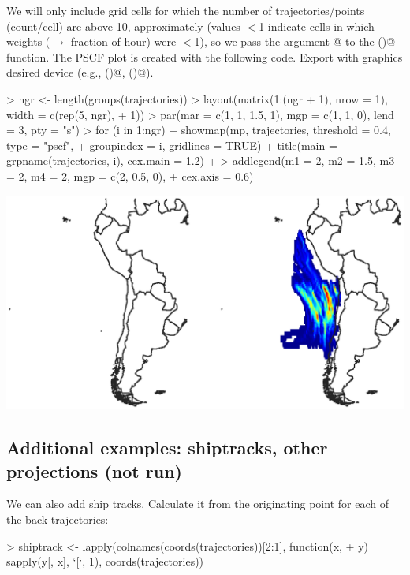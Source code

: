 \documentclass{article}
\renewenvironment{Schunk}{\vspace{\topsep}}{\vspace{\topsep}}
\begin{document}
We will only include grid cells for which the number of
trajectories/points (count/cell) are above 10, approximately (values
$<$1 indicate cells in which weights ($\to$ fraction of hour) were
$<$1), so we pass the argument @ to the
\verb@showmap()@ function. The PSCF plot is created with the following
code. Export with graphics desired device (e.g., \verb@pdf()@,
\verb@png()@).

\begin{Schunk}
\begin{Sinput}
> ngr <- length(groups(trajectories))
> layout(matrix(1:(ngr + 1), nrow = 1), width = c(rep(5, ngr), 
+     1))
> par(mar = c(1, 1, 1.5, 1), mgp = c(1, 1, 0), lend = 3, pty = "s")
> for (i in 1:ngr) {
+     showmap(mp, trajectories, threshold = 0.4, type = "pscf", 
+         groupindex = i, gridlines = TRUE)
+     title(main = grpname(trajectories, i), cex.main = 1.2)
+ }
> addlegend(m1 = 2, m2 = 1.5, m3 = 2, m4 = 2, mgp = c(2, 0.5, 0), 
+     cex.axis = 0.6)
\end{Sinput}
\end{Schunk}
\includegraphics{figures/fig-016}

\subsection{Additional examples: shiptracks, other projections (not run)}


We can also add ship tracks. Calculate it from the originating point
for each of the back trajectories:

\begin{Schunk}
\begin{Sinput}
> shiptrack <- lapply(colnames(coords(trajectories))[2:1], function(x, 
+     y) sapply(y[, x], `[`, 1), coords(trajectories))
\end{Sinput}
\end{Schunk}
\end{document}
